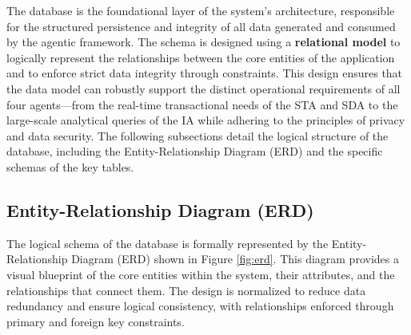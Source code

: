 The database is the foundational layer of the system's architecture, responsible for the structured persistence and integrity of all data generated and consumed by the agentic framework. The schema is designed using a \textbf{relational model} to logically represent the relationships between the core entities of the application and to enforce strict data integrity through constraints. This design ensures that the data model can robustly support the distinct operational requirements of all four agents—from the real-time transactional needs of the STA and SDA to the large-scale analytical queries of the IA while adhering to the principles of privacy and data security. The following subsections detail the logical structure of the database, including the Entity-Relationship Diagram (ERD) and the specific schemas of the key tables.

\subsection{Entity-Relationship Diagram (ERD)}
\label{subsec:erd}

The logical schema of the database is formally represented by the Entity-Relationship Diagram (ERD) shown in Figure \ref{fig:erd}. This diagram provides a visual blueprint of the core entities within the system, their attributes, and the relationships that connect them. The design is normalized to reduce data redundancy and ensure logical consistency, with relationships enforced through primary and foreign key constraints.

